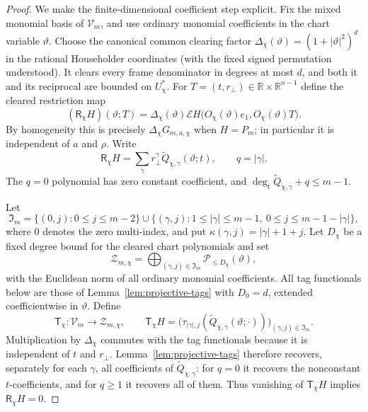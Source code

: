 \documentclass[11pt]{article}
\numberwithin{equation}{section}
\theoremstyle{remark}
\theoremstyle{definition}
\newcommand{\R}{\mathbb R}
\begin{document}
\begin{proof}
We make the finite-dimensional coefficient step explicit.  Fix the mixed
monomial basis of $\mathcal V_m$, and use ordinary monomial coefficients in
the chart variable $\vartheta$.  Choose the canonical common clearing factor
$\Delta_\chi(\vartheta)=(1+|\vartheta|^2)^d$ in the rational
Householder coordinates (with the fixed signed permutation understood).
It clears every frame denominator in degrees at most $d$, and both
it and its reciprocal are bounded on $U_\chi^*$.  For
$T=(t,r_\perp)\in\R\times\R^{n-1}$ define the cleared restriction map
\begin{equation}\label{eq:cleared-oriented-restriction-map}
 (\mathsf R_\chi H)(\vartheta;T)
 =\Delta_\chi(\vartheta)
   \mathcal EH\bigl(O_\chi(\vartheta)e_1,
                    O_\chi(\vartheta)T\bigr).
\end{equation}
By homogeneity this is precisely
$\Delta_\chi G_{m,a,\chi}$ when $H=P_m$; in particular it is independent
of $a$ and $\rho$.  Write
\[
 \mathsf R_\chi H
 =\sum_{\gamma}r_\perp^\gamma
   \widetilde Q_{\chi,\gamma}(\vartheta;t),
 \qquad q=|\gamma|.
\]
The $q=0$ polynomial has zero constant coefficient, and
$\deg_t\widetilde Q_{\chi,\gamma}+q\le m-1$.

Let
\begin{equation}\label{eq:detecting-tag-index-set}
 \mathfrak I_m
 =\{(0,j):0\le j\le m-2\}
  \cup\{(\gamma,j):1\le|\gamma|\le m-1,
                     \ 0\le j\le m-1-|\gamma|\},
\end{equation}
where $0$ denotes the zero multi-index, and put
$\kappa(\gamma,j)=|\gamma|+1+j$.  Let $D_\chi$ be a fixed degree bound for
the cleared chart polynomials and set
\[
 \mathcal Z_{m,\chi}
 =\bigoplus_{(\gamma,j)\in\mathfrak I_m}
   \mathcal P_{\le D_\chi}(\vartheta),
\]
with the Euclidean norm of all ordinary monomial coefficients.  All tag
functionals below are those of Lemma~\ref{lem:projective-tags} with
$D_0=d$, extended coefficientwise in $\vartheta$.  Define
\begin{equation}\label{eq:explicit-detecting-tag-map}
 \mathsf T_\chi:\mathcal V_m\longrightarrow\mathcal Z_{m,\chi},
 \qquad
 \mathsf T_\chi H
 =\bigl(
   \tau_{|\gamma|,j}
   (\widetilde Q_{\chi,\gamma}(\vartheta;\cdot))
   \bigr)_{(\gamma,j)\in\mathfrak I_m}.
\end{equation}
Multiplication by $\Delta_\chi$ commutes with the tag functionals because
it is independent of $t$ and $r_\perp$.  Lemma~\ref{lem:projective-tags}
therefore recovers, separately for each $\gamma$, all coefficients of
$\widetilde Q_{\chi,\gamma}$: for $q=0$ it recovers the nonconstant
$t$-coefficients, and for $q\ge1$ it recovers all of them.  Thus vanishing
of $\mathsf T_\chi H$ implies $\mathsf R_\chi H=0$.


\end{proof}
\end{document}

